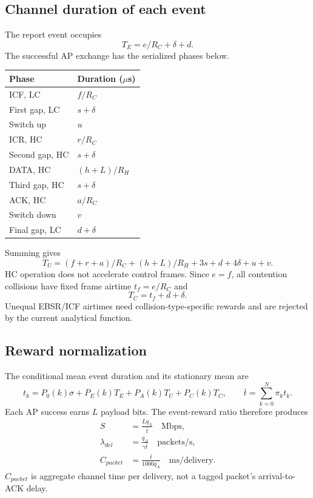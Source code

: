 \documentclass[11pt,a4paper]{article}
\newcommand{\avg}[1]{\sum_{k=0}^{N}\pi_k #1}
\begin{document}
\subsection{Channel duration of each event}
The report event occupies
\begin{equation}
T_E=e/R_C+\delta+d.
\end{equation}
The successful AP exchange has the serialized phases below.
\begin{center}
\begin{tabular}{@{}ll@{}}\toprule
Phase & Duration ($\mu$s)\\\midrule
ICF, LC & $f/R_C$\\
First gap, LC & $s+\delta$\\
Switch up & $u$\\
ICR, HC & $r/R_C$\\
Second gap, HC & $s+\delta$\\
DATA, HC & $(h+L)/R_H$\\
Third gap, HC & $s+\delta$\\
ACK, HC & $a/R_C$\\
Switch down & $v$\\
Final gap, LC & $d+\delta$\\\bottomrule
\end{tabular}
\end{center}
Summing gives
\begin{equation}
T_U=(f+r+a)/R_C+(h+L)/R_H+3s+d+4\delta+u+v.
\end{equation}
HC operation does not accelerate control frames. Since $e=f$, all
contention collisions have fixed frame airtime $t_f=e/R_C$ and
\begin{equation}
T_C=t_f+d+\delta.
\end{equation}
Unequal EBSR/ICF airtimes need collision-type-specific rewards and are
rejected by the current analytical function.

\subsection{Reward normalization}
The conditional mean event duration and its stationary mean are
\begin{equation}
t_k=P_0(k)\sigma+P_E(k)T_E+P_A(k)T_U+P_C(k)T_C,
\qquad \bar t=\avg{t_k}.
\end{equation}
Each AP success earns $L$ payload bits. The event-reward ratio therefore
produces
\begin{align}
S&=\frac{Lq_A}{\bar t}\quad\text{Mbps},\\
\lambda_{del}&=\frac{q_A}{\gamma\bar t}\quad\text{packets/s},\\
C_{packet}&=\frac{\bar t}{1000q_A}\quad\text{ms/delivery}.
\end{align}
$C_{packet}$ is aggregate channel time per delivery, not a tagged packet's
arrival-to-ACK delay.
\end{document}
